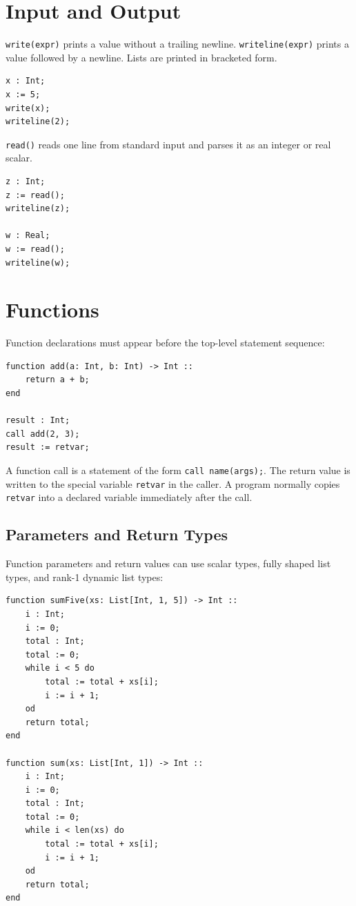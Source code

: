 \documentclass[11pt]{article}
\begin{document}
\section{Input and Output}

\texttt{write(expr)} prints a value without a trailing newline. \texttt{writeline(expr)} prints a value followed by a newline. Lists are printed in bracketed form.

\begin{lstlisting}
x : Int;
x := 5;
write(x);
writeline(2);
\end{lstlisting}

\texttt{read()} reads one line from standard input and parses it as an integer or real scalar.

\begin{lstlisting}
z : Int;
z := read();
writeline(z);

w : Real;
w := read();
writeline(w);
\end{lstlisting}

\section{Functions}

Function declarations must appear before the top-level statement sequence:

\begin{lstlisting}
function add(a: Int, b: Int) -> Int ::
    return a + b;
end

result : Int;
call add(2, 3);
result := retvar;
\end{lstlisting}

A function call is a statement of the form \texttt{call name(args);}. The return value is written to the special variable \texttt{retvar} in the caller. A program normally copies \texttt{retvar} into a declared variable immediately after the call.

\subsection{Parameters and Return Types}

Function parameters and return values can use scalar types, fully shaped list types, and rank-1 dynamic list types:

\begin{lstlisting}
function sumFive(xs: List[Int, 1, 5]) -> Int ::
    i : Int;
    i := 0;
    total : Int;
    total := 0;
    while i < 5 do
        total := total + xs[i];
        i := i + 1;
    od
    return total;
end

function sum(xs: List[Int, 1]) -> Int ::
    i : Int;
    i := 0;
    total : Int;
    total := 0;
    while i < len(xs) do
        total := total + xs[i];
        i := i + 1;
    od
    return total;
end
\end{lstlisting}
\end{document}
